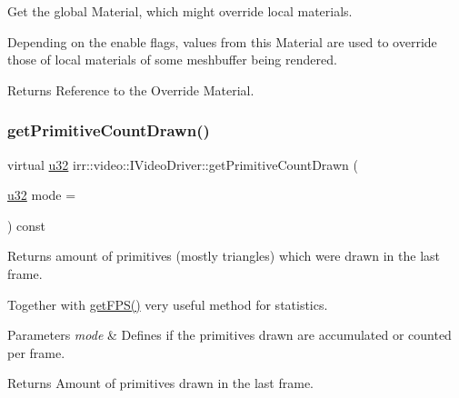 Get the global Material, which might override local materials. 

Depending on the enable flags, values from this Material are used to override those of local materials of some meshbuffer being rendered. \begin{DoxyReturn}{Returns}
Reference to the Override Material. 
\end{DoxyReturn}
\mbox{\label{classirr_1_1video_1_1IVideoDriver_a2ce9be45cacb4aa034d3afdb489a57a3}} 
\subsubsection{\texorpdfstring{get\+Primitive\+Count\+Drawn()}{getPrimitiveCountDrawn()}}
{\footnotesize\ttfamily virtual \hyperlink{namespaceirr_a0416a53257075833e7002efd0a18e804}{u32} irr\+::video\+::\+I\+Video\+Driver\+::get\+Primitive\+Count\+Drawn (\begin{DoxyParamCaption}\item[{\hyperlink{namespaceirr_a0416a53257075833e7002efd0a18e804}{u32}}]{mode = {} }\end{DoxyParamCaption}) const\hspace{0.3cm}{\ttfamily [pure virtual]}}



Returns amount of primitives (mostly triangles) which were drawn in the last frame. 

Together with \hyperlink{classirr_1_1video_1_1IVideoDriver_a5b71428402c0b6a3b18b8f2fa408af13}{get\+F\+P\+S()} very useful method for statistics. 
\begin{DoxyParams}{Parameters}
{\em mode} & Defines if the primitives drawn are accumulated or counted per frame. \\
\hline
\end{DoxyParams}
\begin{DoxyReturn}{Returns}
Amount of primitives drawn in the last frame. 
\end{DoxyReturn}
\mbox{\label{classirr_1_1video_1_1IVideoDriver_aa106dd9ff233497f9ea9a07dc6441c82}} 
